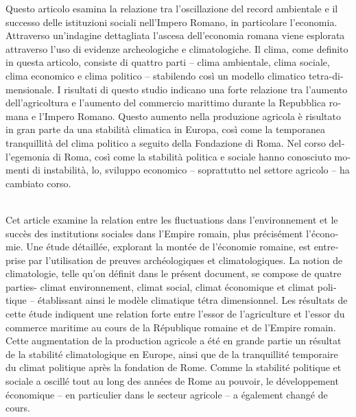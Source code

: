\begin{myabstract}	
	\foreignlanguage{italian}{Questo articolo esamina la relazione tra l'oscillazione del record ambientale e il successo delle istituzioni sociali nell'Impero Romano, in particolare l'economia. Attraverso un'indagine dettagliata l'ascesa dell'economia romana viene esplorata  attraverso l'uso di evidenze archeologiche e climatologiche. Il clima, come definito in questa articolo, consiste di quattro parti – clima ambientale, clima sociale, clima economico e clima politico – stabilendo così un modello climatico tetra-dimensionale. I risultati di questo studio indicano una forte relazione tra l'aumento dell'agricoltura e l'aumento del commercio marittimo durante la Repubblica romana e l'Impero Romano. Questo aumento nella produzione agricola è risultato in gran parte da una stabilità climatica in Europa, così come la temporanea tranquillità del clima politico a seguito della Fondazione di Roma. Nel corso dell'egemonia di Roma, così come la stabilità politica e sociale hanno conosciuto momenti di instabilità, lo, sviluppo economico – soprattutto nel settore agricolo – ha cambiato corso.}

	
	\hspace{2em}\\\noindent%
	\foreignlanguage{french}{Cet article examine la relation entre les fluctuations dans l'environnement et le succès des institutions sociales dans l'Empire romain, plus précisément l'économie. Une étude détaillée, explorant la montée de l'économie romaine, est entreprise par l'utilisation de preuves archéologiques et climatologiques. La notion de climatologie, telle qu’on définit dans le présent document, se compose de quatre parties- climat environnement, climat social, climat économique et climat politique – établissant ainsi le modèle climatique tétra dimensionnel. Les résultats de cette étude indiquent une relation forte entre l'essor de l'agriculture et l'essor du commerce maritime au cours de la République romaine et de l'Empire romain. Cette augmentation de la production agricole a été en grande partie un résultat de la stabilité climatologique en Europe, ainsi que de la tranquillité temporaire du climat politique après la fondation de Rome. Comme la stabilité politique et sociale a oscillé tout au long des années de Rome au pouvoir, le développement économique – en particulier dans le secteur agricole – a également changé de cours.}

\end{myabstract}
	



	\printbibliography[heading=subbibnumbered] 

	\label{davis:lastpage}
\closingarticle

